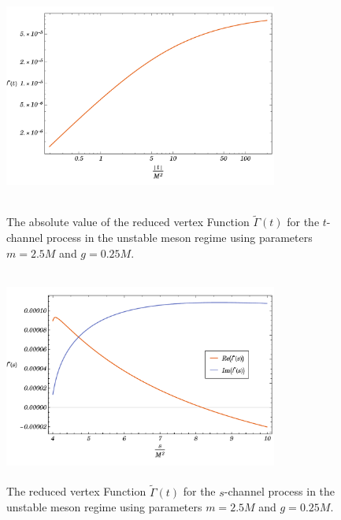 \documentclass{article}
\begin{document}
\begin{figure}[!htb]
    \centering
    \begin{minipage}[b]{.45\textwidth}
        \centering
        \includegraphics[width=9cm, height=7cm]	{Gamma-t-channel-unstable}
        \caption{The absolute value of the reduced vertex Function $\tilde{\Gamma}(t)$ for the $t$-channel process in the unstable meson regime using parameters $m = 2.5M$ and $g = 0.25M$.}
        \label{fig:gamma1}
    \end{minipage}%
    \hfill
    \begin{minipage}[b]{0.45\textwidth}
        \centering
        \includegraphics[width=9cm, height=7cm]{Gamma-s-channel-unstable}
        \caption{The reduced vertex Function $\tilde{\Gamma}(t)$ for the $s$-channel process in the unstable meson regime using parameters $m = 2.5M$ and $g = 0.25M$.}
        \label{fig:gamma1}
    \end{minipage}
\end{figure}
\end{document}
